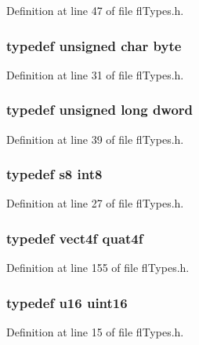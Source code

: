 Definition at line 47 of file fl\-Types.h.
\subsubsection{\setlength{\rightskip}{0pt plus 5cm}typedef unsigned char {\bf byte}}\label{flTypes_8h_0c8186d9b9b7880309c27230bbb5e69d}




Definition at line 31 of file fl\-Types.h.
\subsubsection{\setlength{\rightskip}{0pt plus 5cm}typedef unsigned long {\bf dword}}\label{flTypes_8h_74cb93d430006e784da73b8ca406ee6e}




Definition at line 39 of file fl\-Types.h.
\subsubsection{\setlength{\rightskip}{0pt plus 5cm}typedef s8 {\bf int8}}\label{flTypes_8h_e652227737a6faf57dd88c9005ce1c48}




Definition at line 27 of file fl\-Types.h.
\subsubsection{\setlength{\rightskip}{0pt plus 5cm}typedef {\bf vect4f} {\bf quat4f}}\label{flTypes_8h_9685a5eb7bee6706c3a1253287fd8efc}




Definition at line 155 of file fl\-Types.h.
\subsubsection{\setlength{\rightskip}{0pt plus 5cm}typedef u16 {\bf uint16}}\label{flTypes_8h_61a80909816e20159dd5e79a5c7cb343}




Definition at line 15 of file fl\-Types.h.
